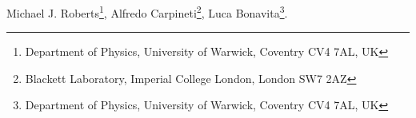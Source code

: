 Michael J. Roberts\footnote{\tiny{Department of Physics, University of Warwick, Coventry CV4 7AL, UK}}, Alfredo Carpineti\footnote{\tiny{Blackett Laboratory, Imperial College London, London SW7 2AZ}}, Luca Bonavita\footnote{\tiny{Department of Physics, University of Warwick, Coventry CV4 7AL, UK}}. 